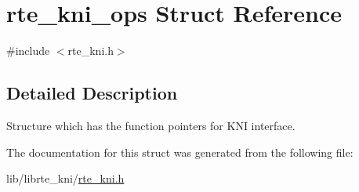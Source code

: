 \hypertarget{structrte__kni__ops}{}\section{rte\+\_\+kni\+\_\+ops Struct Reference}
\label{structrte__kni__ops}


{\ttfamily \#include $<$rte\+\_\+kni.\+h$>$}



\subsection{Detailed Description}
Structure which has the function pointers for K\+N\+I interface. 

The documentation for this struct was generated from the following file\+:\begin{DoxyCompactItemize}
\item 
lib/librte\+\_\+kni/\hyperlink{rte__kni_8h}{rte\+\_\+kni.\+h}\end{DoxyCompactItemize}
